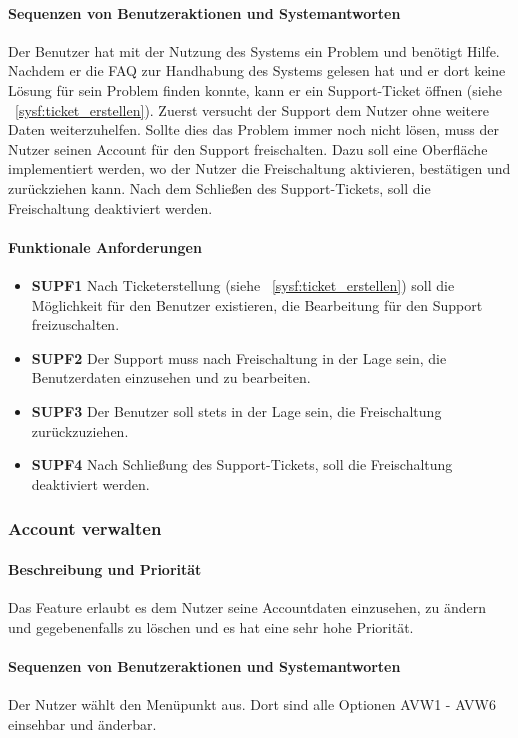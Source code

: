 \paragraph{Sequenzen von Benutzeraktionen und Systemantworten}
Der Benutzer hat mit der Nutzung des Systems ein Problem und benötigt Hilfe.
Nachdem er die FAQ zur Handhabung des Systems gelesen hat und er dort keine Lösung für sein Problem finden konnte,
kann er ein Support-Ticket öffnen (siehe ~\ref{sysf:ticket_erstellen}).
Zuerst versucht der Support dem Nutzer ohne weitere Daten weiterzuhelfen.
Sollte dies das Problem immer noch nicht lösen, muss der Nutzer seinen Account für den Support freischalten.
Dazu soll eine Oberfläche implementiert werden, wo der Nutzer die Freischaltung aktivieren, bestätigen und zurückziehen kann.
Nach dem Schließen des Support-Tickets, soll die Freischaltung deaktiviert werden.
\paragraph{Funktionale Anforderungen}
\begin{itemize}
	\item \textbf{SUPF1} Nach Ticketerstellung (siehe ~\ref{sysf:ticket_erstellen}) soll die Möglichkeit
						für den Benutzer existieren, die Bearbeitung für den Support freizuschalten.
	\item \textbf{SUPF2} Der Support muss nach Freischaltung in der Lage sein, die Benutzerdaten einzusehen und zu bearbeiten.
	\item \textbf{SUPF3} Der Benutzer soll stets in der Lage sein, die Freischaltung zurückzuziehen.
	\item \textbf{SUPF4} Nach Schließung des Support-Tickets, soll die Freischaltung deaktiviert werden.
\end{itemize}


\subsubsection{Account verwalten}
\paragraph{Beschreibung und Priorität}
Das Feature erlaubt es dem Nutzer seine Accountdaten einzusehen, zu ändern und gegebenenfalls zu löschen
und es hat eine sehr hohe Priorität.

\paragraph{Sequenzen von Benutzeraktionen und Systemantworten}
Der Nutzer wählt den Menüpunkt  aus.
Dort sind alle Optionen AVW1 - AVW6 einsehbar und änderbar.

